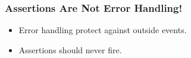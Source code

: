 \begin{frame}[fragile] %
\frametitle{Assertions Are Not Error Handling!}

\begin{itemize}
\item Error handling protect against outside events.
\item Assertions \alert{should never} fire.
\end{itemize}
\end{frame}



